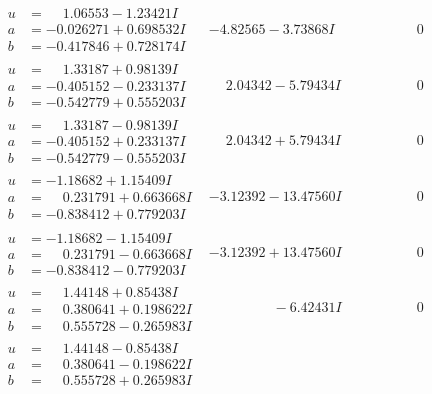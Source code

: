 \documentclass[1p]{elsarticle_modified}
\theoremstyle{definition}
\begin{document}
$$\begin{array}{c|c|c}
\begin{aligned}
u &= \phantom{-}1.06553 - 1.23421 I \\
a &= -0.026271 + 0.698532 I \\
b &= -0.417846 + 0.728174 I\end{aligned}
 & -4.82565 - 3.73868 I & \phantom{-0.000000 } 0 \\ \hline\begin{aligned}
u &= \phantom{-}1.33187 + 0.98139 I \\
a &= -0.405152 - 0.233137 I \\
b &= -0.542779 + 0.555203 I\end{aligned}
 & \phantom{-}2.04342 - 5.79434 I & \phantom{-0.000000 } 0 \\ \hline\begin{aligned}
u &= \phantom{-}1.33187 - 0.98139 I \\
a &= -0.405152 + 0.233137 I \\
b &= -0.542779 - 0.555203 I\end{aligned}
 & \phantom{-}2.04342 + 5.79434 I & \phantom{-0.000000 } 0 \\ \hline\begin{aligned}
u &= -1.18682 + 1.15409 I \\
a &= \phantom{-}0.231791 + 0.663668 I \\
b &= -0.838412 + 0.779203 I\end{aligned}
 & -3.12392 - 13.47560 I & \phantom{-0.000000 } 0 \\ \hline\begin{aligned}
u &= -1.18682 - 1.15409 I \\
a &= \phantom{-}0.231791 - 0.663668 I \\
b &= -0.838412 - 0.779203 I\end{aligned}
 & -3.12392 + 13.47560 I & \phantom{-0.000000 } 0 \\ \hline\begin{aligned}
u &= \phantom{-}1.44148 + 0.85438 I \\
a &= \phantom{-}0.380641 + 0.198622 I \\
b &= \phantom{-}0.555728 - 0.265983 I\end{aligned}
 & \phantom{-0.000000 } -6.42431 I & \phantom{-0.000000 } 0 \\ \hline\begin{aligned}
u &= \phantom{-}1.44148 - 0.85438 I \\
a &= \phantom{-}0.380641 - 0.198622 I \\
b &= \phantom{-}0.555728 + 0.265983 I\end{aligned}

\end{array}$$
\end{document}
